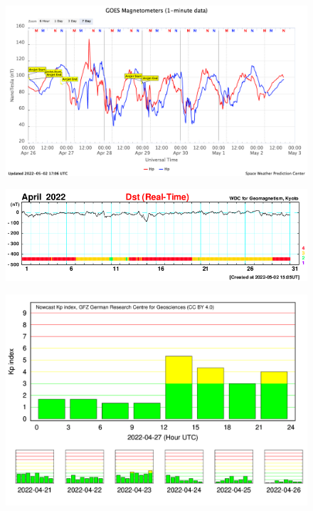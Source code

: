 \documentclass[11pt, oneside]{article}
\begin{document}
                     \begin{figure}[H]
    
                        \centering
   
                             \includegraphics[width=14cm]{./figures/figureGeomag_4.png}

                        \end{figure}

                     \begin{figure}[H]
    
                        \centering
   
                             \includegraphics[width=14cm]{./figures/figureGeomag_5.png}

                        \end{figure}

                     \begin{figure}[H]
    
                        \centering
   
                             \includegraphics[width=14cm]{./figures/figureGeomag_6.png}

                        \end{figure}
\end{document}
